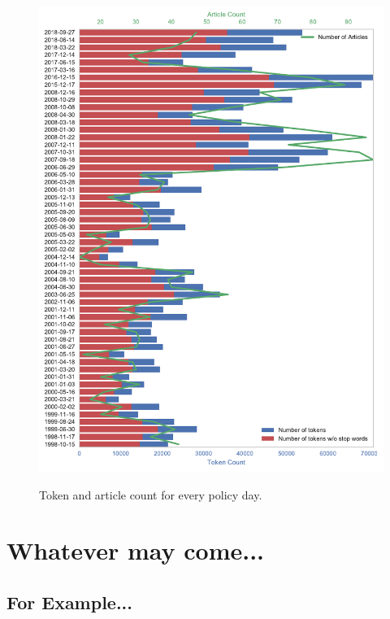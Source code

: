\documentclass[11pt,a4paper,english,oneside]{book}
\numberwithin{equation}{chapter}
\begin{document}
\begin{figure}
	\caption{Token and article count for every policy day.}
	\centering
	\includegraphics[scale=1]{Images/tokencount.pdf}
	\label{tokencount}
\end{figure}



\renewcommand{\theequation}{C.\arabic{equation}}


\chapter{Whatever may come...}



\section{For Example... }

\lipsum[2-8]
\end{document}
